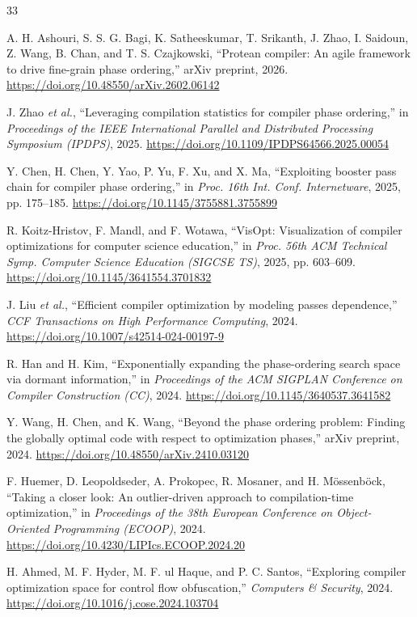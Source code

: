 \documentclass[conference]{IEEEtran}
\begin{document}
\begin{thebibliography}{33}

A. H. Ashouri, S. S. G. Bagi, K. Satheeskumar, T. Srikanth, J. Zhao, I. Saidoun, Z. Wang, B. Chan, and T. S. Czajkowski,
``Protean compiler: An agile framework to drive fine-grain phase ordering,''
arXiv preprint, 2026.
\url{https://doi.org/10.48550/arXiv.2602.06142}

J. Zhao \textit{et al.},
``Leveraging compilation statistics for compiler phase ordering,''
in \textit{Proceedings of the IEEE International Parallel and Distributed Processing Symposium (IPDPS)}, 2025.
\url{https://doi.org/10.1109/IPDPS64566.2025.00054}

Y. Chen, H. Chen, Y. Yao, P. Yu, F. Xu, and X. Ma,
``Exploiting booster pass chain for compiler phase ordering,''
in \textit{Proc. 16th Int. Conf. Internetware}, 2025, pp. 175--185.
\url{https://doi.org/10.1145/3755881.3755899}

R. Koitz-Hristov, F. Mandl, and F. Wotawa,
``VisOpt: Visualization of compiler optimizations for computer science education,''
in \textit{Proc. 56th ACM Technical Symp. Computer Science Education (SIGCSE TS)}, 2025, pp. 603--609.
\url{https://doi.org/10.1145/3641554.3701832}

J. Liu \textit{et al.},
``Efficient compiler optimization by modeling passes dependence,''
\textit{CCF Transactions on High Performance Computing}, 2024.
\url{https://doi.org/10.1007/s42514-024-00197-9}

R. Han and H. Kim,
``Exponentially expanding the phase-ordering search space via dormant information,''
in \textit{Proceedings of the ACM SIGPLAN Conference on Compiler Construction (CC)}, 2024.
\url{https://doi.org/10.1145/3640537.3641582}

Y. Wang, H. Chen, and K. Wang,
``Beyond the phase ordering problem: Finding the globally optimal code with respect to optimization phases,''
arXiv preprint, 2024.
\url{https://doi.org/10.48550/arXiv.2410.03120}

F. Huemer, D. Leopoldseder, A. Prokopec, R. Mosaner, and H. Mössenböck,
``Taking a closer look: An outlier-driven approach to compilation-time optimization,''
in \textit{Proceedings of the 38th European Conference on Object-Oriented Programming (ECOOP)}, 2024.
\url{https://doi.org/10.4230/LIPIcs.ECOOP.2024.20}

H. Ahmed, M. F. Hyder, M. F. ul Haque, and P. C. Santos,
``Exploring compiler optimization space for control flow obfuscation,''
\textit{Computers \& Security}, 2024.
\url{https://doi.org/10.1016/j.cose.2024.103704}


\end{thebibliography}
\end{document}
